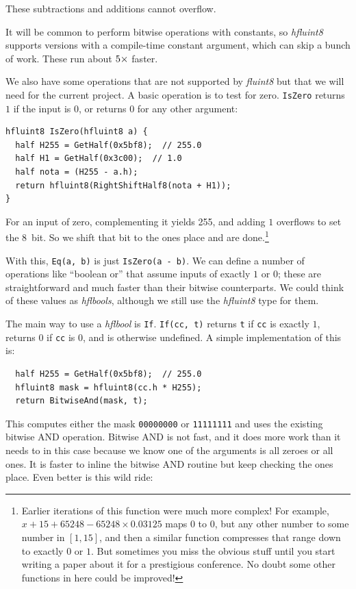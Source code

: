 \documentclass[twocolumn]{article}
\begin{document}
These subtractions and additions cannot overflow.

It will be common to perform bitwise operations with constants, so
{\it hfluint8} supports versions with a compile-time constant
argument, which can skip a bunch of work. These run about $5{}{\scriptsize \times}$
faster.

We also have some operations that are not supported by {\it fluint8}
but that we will need for the current project. A basic operation is
to test for zero. \verb|IsZero| returns $1$ if the input is $0$, or
returns $0$ for any other argument:

\begin{lstlisting}
hfluint8 IsZero(hfluint8 a) {
  half H255 = GetHalf(0x5bf8);  // 255.0
  half H1 = GetHalf(0x3c00);  // 1.0
  half nota = (H255 - a.h);
  return hfluint8(RightShiftHalf8(nota + H1));
}
\end{lstlisting}

For an input of zero, complementing it yields 255, and adding $1$
overflows to set the 8\th\ bit. So we shift that bit to the ones
place and are done.\footnote{Earlier iterations of this function
  were much more complex! For example, $x + 15 + 65248 - 65248 \times 0.03125$
  maps $0$ to $0$, but any other number to some number in $[1, 15]$,
  and then a similar function compresses that range down to exactly $0$ or $1$.
  But sometimes you miss the obvious stuff until you start writing
  a paper about it for a prestigious conference. No doubt some other
  functions in here could be improved!}

With this, \verb+Eq(a, b)+ is just \verb+IsZero(a - b)+. We can define
a number of operations like ``boolean or'' that assume inputs of
exactly $1$ or $0$; these are straightforward and much faster than
their bitwise counterparts. We could think of these values as {\it
  hflbools}, although we still use the {\it hfluint8} type for them.

The main way to use a {\it hflbool} is \verb+If+.
\verb|If(cc, t)| returns \verb+t+ if \verb+cc+ is exactly $1$,
returns $0$ if \verb+cc+ is $0$, and is otherwise undefined. A
simple implementation of this is:

\begin{lstlisting}
  half H255 = GetHalf(0x5bf8);  // 255.0
  hfluint8 mask = hfluint8(cc.h * H255);
  return BitwiseAnd(mask, t);
\end{lstlisting}

This computes either the mask \verb+00000000+ or \verb+11111111+ and
uses the existing bitwise AND operation. Bitwise AND is not fast, and
it does more work than it needs to in this case because we know one of
the arguments is all zeroes or all ones. It is faster to inline the
bitwise AND routine but keep checking the ones place. Even better is
this wild ride:
\end{document}
